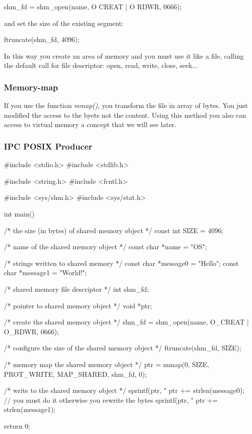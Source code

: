 \begin{codeInC}
shm_fd = shm_open(name, O CREAT | O RDWR, 0666);
\end{codeInC}

and set the size of the existing segment:
\begin{codeInC}
ftruncate(shm_fd, 4096); 
\end{codeInC}

In this way you create an area of memory and you must use it like a file, calling the default call for file descriptor: open, read, write, close, seek...

\newpage
\subsubsection{Memory-map}
If you use the function \textit{mmap()}, you transform the file in array of bytes. You just modified the access to the byets not the content. Using this method you also can access to virtual memory a concept that we will see later.


\subsubsection{IPC POSIX Producer}
\begin{codeInC}
#include <stdio.h>
#include <stdlib.h>

#include <string.h>
#include <fcntl.h>

#include <sys/shm.h>
#include <sys/stat.h>

int main() {

    /* the size (in bytes) of shared memory object */
    const int SIZE = 4096;
    
    /* name of the shared memory object */
    const char *name = "OS";
    
    /* strings written to shared memory */
    const char *message0 = "Hello";
    const char *message1 = "World!";
    
    /* shared memory file descriptor */
    int shm_fd;
    
    /* pointer to shared memory object */
    void *ptr;
    
    /* create the shared memory object */
    shm_fd = shm_open(name, O_CREAT | O_RDWR, 0666);
    
    /* configure the size of the shared memory object */
    ftruncate(shm_fd, SIZE);
    
    /* memory map the shared memory object */
    ptr = mmap(0, SIZE, PROT_WRITE, MAP_SHARED, shm_fd, 0);
    
    /* write to the shared memory object */
    sprintf(ptr, "%
    ptr += strlen(message0);  // you must do it otherwise you rewrite the bytes
    sprintf(ptr, "%
    ptr += strlen(message1);
    
    return 0;
}

\end{codeInC}

